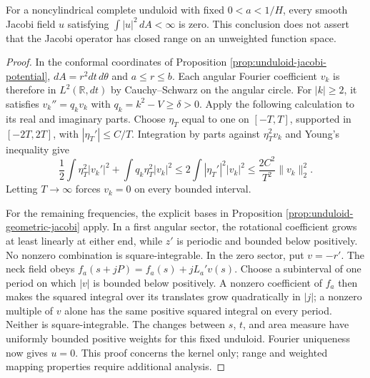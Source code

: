 \begin{proposition}\label{prop:unduloid-no-l2-jacobi}
For a noncylindrical complete unduloid with fixed $0<a<1/H$, every smooth Jacobi field $u$ satisfying $\int|u|^2\,dA<\infty$ is zero. This conclusion does not assert that the Jacobi operator has closed range on an unweighted function space.
\end{proposition}
\begin{proof}
In the conformal coordinates of Proposition \ref{prop:unduloid-jacobi-potential}, $dA=r^2dt\,d\theta$ and $a\le r\le b$. Each angular Fourier coefficient $v_k$ is therefore in $L^2(\mathbb R,dt)$ by Cauchy--Schwarz on the angular circle. For $|k|\ge2$, it satisfies $v_k''=q_kv_k$ with $q_k=k^2-V\ge\delta>0$. Apply the following calculation to its real and imaginary parts. Choose $\eta_T$ equal to one on $[-T,T]$, supported in $[-2T,2T]$, with $|\eta_T'|\le C/T$. Integration by parts against $\eta_T^2v_k$ and Young's inequality give
\[
 \frac12\int\eta_T^2|v_k'|^2+\int q_k\eta_T^2|v_k|^2
 \le2\int|\eta_T'|^2|v_k|^2\le\frac{2C^2}{T^2}\|v_k\|_2^2.
\]
Letting $T\to\infty$ forces $v_k=0$ on every bounded interval.

For the remaining frequencies, the explicit bases in Proposition \ref{prop:unduloid-geometric-jacobi} apply. In a first angular sector, the rotational coefficient grows at least linearly at either end, while $z'$ is periodic and bounded below positively. No nonzero combination is square-integrable. In the zero sector, put $v=-r'$. The neck field obeys $f_a(s+jP)=f_a(s)+jL_a'v(s)$. Choose a subinterval of one period on which $|v|$ is bounded below positively. A nonzero coefficient of $f_a$ then makes the squared integral over its translates grow quadratically in $|j|$; a nonzero multiple of $v$ alone has the same positive squared integral on every period. Neither is square-integrable. The changes between $s$, $t$, and area measure have uniformly bounded positive weights for this fixed unduloid. Fourier uniqueness now gives $u=0$. This proof concerns the kernel only; range and weighted mapping properties require additional analysis.
\end{proof}
